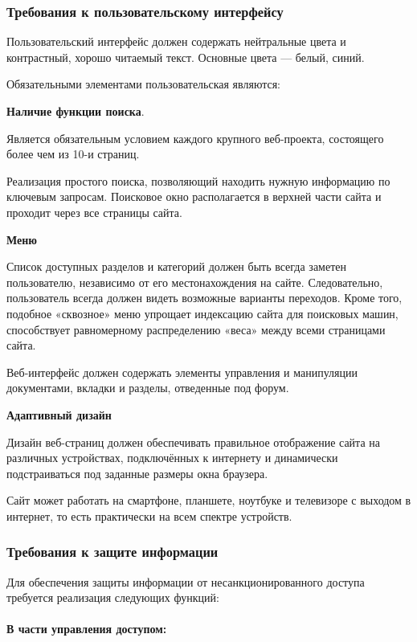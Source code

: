 \documentclass[a4paper,14pt]{extarticle}
\begin{document}
\subsubsection{Требования к пользовательскому интерфейсу}
Пользовательский интерфейс должен содержать нейтральные цвета и
контрастный, хорошо читаемый текст. Основные цвета --- белый, синий.

Обязательными элементами пользовательская  являются:

\textbf{Наличие функции поиска}.

 Является обязательным условием каждого крупного веб-проекта, состоящего более чем из 10-и страниц.
	
	Реализация простого поиска, позволяющий находить нужную информацию по ключевым запросам. Поисковое окно располагается в верхней части сайта и проходит через все страницы сайта.
	
\textbf{Меню}
	
	Список доступных разделов и категорий должен быть всегда заметен пользователю, независимо от его местонахождения на сайте. Следовательно, пользователь всегда должен видеть возможные варианты переходов.
	Кроме того, подобное «сквозное» меню упрощает индексацию сайта для поисковых машин, способствует равномерному распределению «веса» между всеми страницами сайта.
	
	Веб-интерфейс должен содержать элементы управления и манипуляции документами, вкладки и разделы, отведенные под форум.
	
	 \textbf{Адаптивный дизайн}
	
	Дизайн веб-страниц должен обеспечивать правильное отображение сайта на различных устройствах, подключённых к интернету и динамически подстраиваться под заданные размеры окна браузера.
	
	Сайт может работать на смартфоне, планшете, ноутбуке и телевизоре с выходом в интернет, то есть практически на всем спектре устройств.
	
\subsubsection{Требования к защите информации}
Для обеспечения защиты информации от несанкционированного доступа требуется реализация следующих функций:

\paragraph*{В части управления доступом:}
\end{document}
